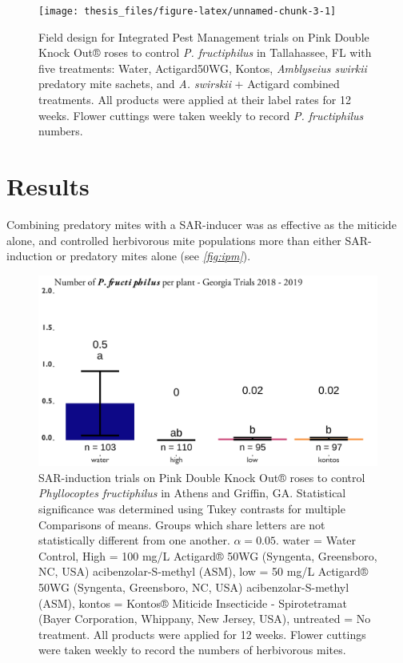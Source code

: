 \documentclass[12pt,final,CPage]{ufthesis}
\begin{document}
{\begin{figure}
  {\centering \texttt{[image: thesis\_files/figure-latex/unnamed-chunk-3-1]} 

  }

  \caption{Field design for Integrated Pest Management trials on Pink Double Knock Out® roses to control \textit{P. fructiphilus} in Tallahassee, FL with five treatments: Water, Actigard50WG, Kontos, \textit{Amblyseius swirkii} predatory mite sachets, and \textit{A. swirskii} + Actigard combined treatments. All products were applied at their label rates for 12 weeks. Flower cuttings were taken weekly to record \textit{P. fructiphilus} numbers.}\label{fig:unnamed-chunk-3}
  \end{figure}
  \hypertarget{results-asm-ipm}{%
  \section{Results}\label{results-asm-ipm}}

  Combining predatory mites with a SAR-inducer was as effective as the miticide alone, and controlled herbivorous mite populations more than either SAR-induction or predatory mites alone (see \emph{\ref{fig:ipm}}).
  \begin{figure}

  {\centering \includegraphics[width=0.8\linewidth]{figure/actigard_graph} 

  }

  \caption{SAR-induction trials on Pink Double Knock Out® roses to control \textit{Phyllocoptes fructiphilus} in Athens and Griffin, GA. Statistical significance was determined using Tukey contrasts for multiple Comparisons of means. Groups which share letters are not statistically different from one another. $\alpha = 0.05$. water = Water Control, High = 100 \si{\milli\gram}/\si{\liter} Actigard® 50WG (Syngenta, Greensboro, NC, USA) acibenzolar-S-methyl (ASM), low = 50 \si{\milli\gram}/\si{\liter} Actigard® 50WG (Syngenta, Greensboro, NC, USA) acibenzolar-S-methyl (ASM), kontos = Kontos® Miticide Insecticide - Spirotetramat (Bayer Corporation, Whippany, New Jersey, USA), untreated = No treatment. All products were applied for 12 weeks. Flower cuttings were taken weekly to record the numbers of herbivorous mites.}\label{fig:asm-graph}
  \end{figure}
  \begin{table}


\end{table}}
\end{document}

